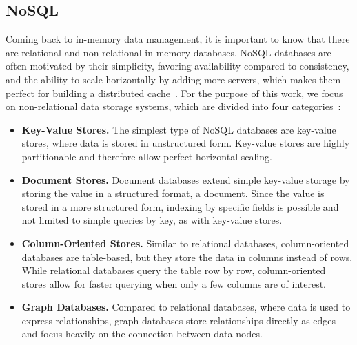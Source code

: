 \subsection{NoSQL}
\label{subsec:nosql}
Coming back to in-memory data management, it is important to know that there are relational and non-relational in-memory databases. NoSQL databases are often motivated by their simplicity, favoring availability compared to consistency, and the ability to scale horizontally by adding more servers, which makes them perfect for building a distributed cache~\cite{zhang_-memory_2015, mohamed_relational_2014}. For the purpose of this work, we focus on non-relational data storage systems, which are divided into four categories~\cite{mathew_analysis_2015}:
\begin{itemize}
  \item \textbf{Key-Value Stores.} The simplest type of NoSQL databases are key-value stores, where data is stored in unstructured form. Key-value stores are highly partitionable and therefore allow perfect horizontal scaling. 
  \item \textbf{Document Stores.} Document databases extend simple key-value storage by storing the value in a structured format, a document. Since the value is stored in a more structured form, indexing by specific fields is possible and not limited to simple queries by key, as with key-value stores.
  \item \textbf{Column-Oriented Stores.} Similar to relational databases, column-oriented databases are table-based, but they store the data in columns instead of rows. While relational databases query the table row by row, column-oriented stores allow for faster querying when only a few columns are of interest.
  \item \textbf{Graph Databases.} Compared to relational databases, where data is used to express relationships, graph databases store relationships directly as edges and focus heavily on the connection between data nodes.
\end{itemize}


